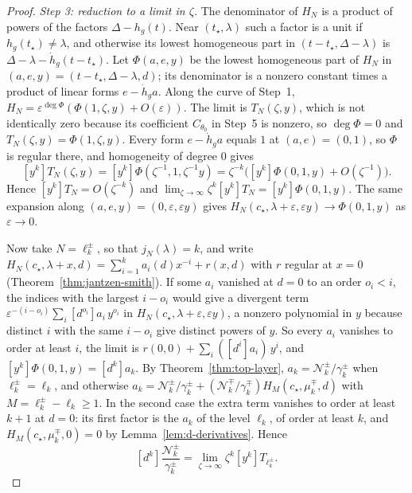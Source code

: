 \documentclass[twoside,10pt]{article}
\numberwithin{equation}{section}
\theoremstyle{slbody}
\theoremstyle{definition}
\theoremstyle{remark}
\begin{document}
\begin{proof}
\emph{Step 3: reduction to a limit in \(\zeta\).}  The denominator of
\(H_N\) is a product of powers of the factors \(\Delta-h_g(t)\).  Near
\((t_\star,\lambda)\) such a factor is a unit if
\(h_g(t_\star)\neq\lambda\), and otherwise its lowest homogeneous part in
\((t-t_\star,\Delta-\lambda)\) is \(\Delta-\lambda-\dot h_g(t-t_\star)\).
Let \(\Phi(a,e,y)\) be the lowest homogeneous part of \(H_N\) in
\((a,e,y)=(t-t_\star,\Delta-\lambda,d)\); its denominator is a nonzero
constant times a product of linear forms \(e-\dot h_ga\).  Along the curve of
Step~1, \(H_N=\varepsilon^{\deg\Phi}(\Phi(1,\zeta,y)+O(\varepsilon))\).  The
limit is \(T_N(\zeta,y)\), which is not identically zero because its
coefficient \(C_{\theta_0}\) in Step~5 is nonzero, so \(\deg\Phi=0\) and
\(T_N(\zeta,y)=\Phi(1,\zeta,y)\).  Every form \(e-\dot h_ga\) equals \(1\) at
\((a,e)=(0,1)\), so \(\Phi\) is regular there, and homogeneity of degree
\(0\) gives
\[
 [y^k]T_N(\zeta,y)=[y^k]\Phi(\zeta^{-1},1,\zeta^{-1}y)
 =\zeta^{-k}\bigl([y^k]\Phi(0,1,y)+O(\zeta^{-1})\bigr).
\]
Hence \([y^k]T_N=O(\zeta^{-k})\) and
\(\lim_{\zeta\to\infty}\zeta^k[y^k]T_N=[y^k]\Phi(0,1,y)\).  The same
expansion along \((a,e,y)=(0,\varepsilon,\varepsilon y)\) gives
\(H_N(c_\star,\lambda+\varepsilon,\varepsilon y)\to\Phi(0,1,y)\) as
\(\varepsilon\to0\).

Now take \(N=\ell^\pm_k\), so that \(j_N(\lambda)=k\), and write
\(H_N(c_\star,\lambda+x,d)=\sum_{i=1}^ka_i(d)x^{-i}+r(x,d)\) with \(r\)
regular at \(x=0\) (Theorem~\ref{thm:jantzen-smith}).  If some \(a_i\)
vanished at \(d=0\) to an order \(o_i<i\), the indices with the largest
\(i-o_i\) would give a divergent term
\(\varepsilon^{-(i-o_i)}\sum_i[d^{o_i}]a_i\,y^{o_i}\) in
\(H_N(c_\star,\lambda+\varepsilon,\varepsilon y)\), a nonzero polynomial in
\(y\) because distinct \(i\) with the same \(i-o_i\) give distinct powers of
\(y\).  So every \(a_i\) vanishes to order at least \(i\), the limit is
\(r(0,0)+\sum_i([d^i]a_i)\,y^i\), and \([y^k]\Phi(0,1,y)=[d^k]a_k\).  By
Theorem~\ref{thm:top-layer}, \(a_k=\mathcal N^\pm_k/\gamma^\pm_k\) when
\(\ell^\pm_k=\ell_k\), and otherwise
\(a_k=\mathcal N^\pm_k/\gamma^\pm_k
+(\mathcal N^\mp_k/\gamma^\mp_k)H_M(c_\star,\mu^\mp_k,d)\) with
\(M=\ell^\pm_k-\ell_k\geq1\).  In the second case the extra term vanishes to
order at least \(k+1\) at \(d=0\): its first factor is the \(a_k\) of the
level \(\ell_k\), of order at least \(k\), and \(H_M(c_\star,\mu^\mp_k,0)=0\)
by Lemma~\ref{lem:d-derivatives}.  Hence
\[
 [d^k]\frac{\mathcal N^\pm_k}{\gamma^\pm_k}
 =\lim_{\zeta\to\infty}\zeta^k[y^k]T_{\ell^\pm_k}.
\]


\end{proof}
\end{document}

